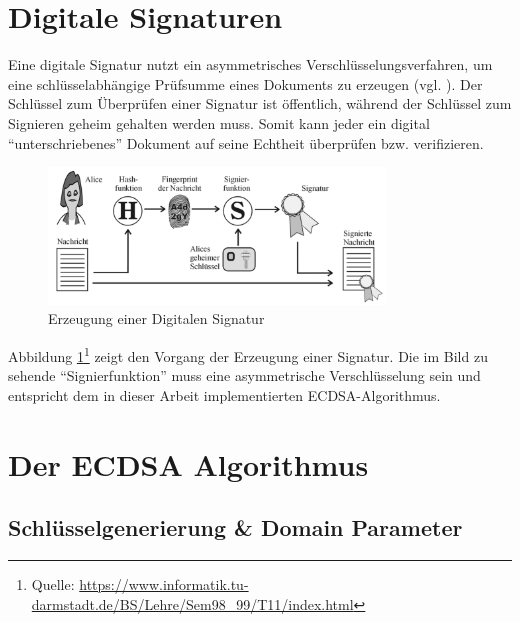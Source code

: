 \section{Digitale Signaturen} \label{sec:digsig}

Eine digitale Signatur nutzt ein asymmetrisches Verschlüsselungsverfahren, um eine schlüsselabhängige Prüfsumme eines Dokuments zu erzeugen (vgl. \cite{wolf}). Der Schlüssel zum Überprüfen einer Signatur ist öffentlich, während der Schlüssel zum Signieren geheim gehalten werden muss. Somit kann jeder ein digital ``unterschriebenes'' Dokument auf seine Echtheit überprüfen bzw. verifizieren.

\begin{figure}[H]
	\centering
   \includegraphics[width=0.80\textwidth]{bilder/digisig}
	\caption{Erzeugung einer Digitalen Signatur}
	\label{fig:digisig}
\end{figure}

Abbildung \ref{fig:digisig}\footnote{Quelle: \url{https://www.informatik.tu-darmstadt.de/BS/Lehre/Sem98\_99/T11/index.html}} zeigt den Vorgang der Erzeugung einer Signatur. Die im Bild zu sehende ``Signierfunktion'' muss eine asymmetrische Verschlüsselung sein und entspricht dem in dieser Arbeit implementierten ECDSA-Algorithmus.

\section{Der ECDSA Algorithmus}
\label{ecdsa-algo}

\subsection{Schlüsselgenerierung \& Domain Parameter}

